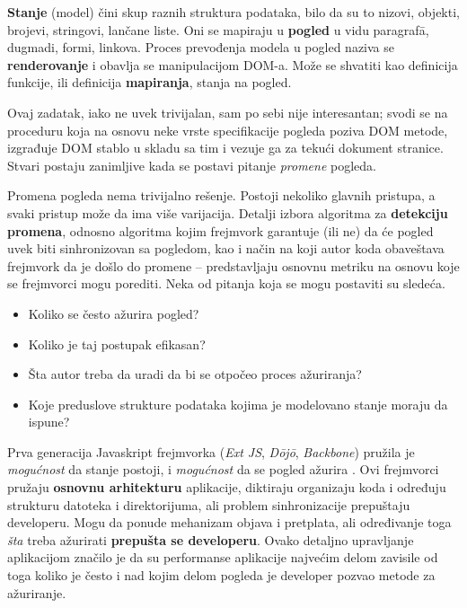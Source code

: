 \textbf{Stanje} (model) čini skup raznih struktura podataka, bilo da su to nizovi, objekti, brojevi, stringovi, lančane liste.
Oni se mapiraju u \textbf{pogled} u vidu paragraf\=a, dugmadi, formi, linkova.
Proces prevođenja modela u pogled naziva se \textbf{renderovanje} i obavlja se manipulacijom DOM-a.
Može se shvatiti kao definicija funkcije, ili definicija \textbf{mapiranja}, stanja na pogled.

Ovaj zadatak, iako ne uvek trivijalan, sam po sebi nije interesantan; svodi se na proceduru koja na osnovu neke vrste specifikacije pogleda poziva DOM metode, izgrađuje DOM stablo u skladu sa tim i vezuje ga za tekući dokument stranice.
Stvari postaju zanimljive kada se postavi pitanje \emph{promene} pogleda.

Promena pogleda nema trivijalno rešenje.
Postoji nekoliko glavnih pristupa, a svaki pristup može da ima više varijacija.
Detalji izbora algoritma za \textbf{detekciju promena}, odnosno algoritma kojim frejmvork garantuje (ili ne) da će pogled uvek biti sinhronizovan sa pogledom, kao i način na koji autor koda obaveštava frejmvork da je došlo do promene -- predstavljaju osnovnu metriku na osnovu koje se frejmvorci mogu porediti.
Neka od pitanja koja se mogu postaviti su sledeća.

\begin{itemize}
  \item Koliko se često ažurira pogled?
  \item Koliko je taj postupak efikasan?
  \item Šta autor treba da uradi da bi se otpočeo proces ažuriranja?
  \item Koje preduslove strukture podataka kojima je modelovano stanje moraju da ispune?
\end{itemize}

Prva generacija Javaskript frejmvorka (\textsl{Ext JS}, \textsl{D\=oj\=o}, \textsl{Backbone}) pružila je \emph{mogućnost} da stanje postoji, i \emph{mogućnost} da se pogled ažurira \cite{teropa:cd}.
Ovi frejmvorci pružaju \textbf{osnovnu arhitekturu} aplikacije, diktiraju organizaju koda i određuju strukturu datoteka i direktorijuma, ali problem sinhronizacije prepuštaju developeru.
Mogu da ponude mehanizam objava i pretplata, ali određivanje toga \emph{šta} treba ažurirati \textbf{prepušta se developeru}.
Ovako detaljno upravljanje aplikacijom značilo je da su performanse aplikacije najvećim delom zavisile od toga koliko je često i nad kojim delom pogleda je developer pozvao metode za ažuriranje.


